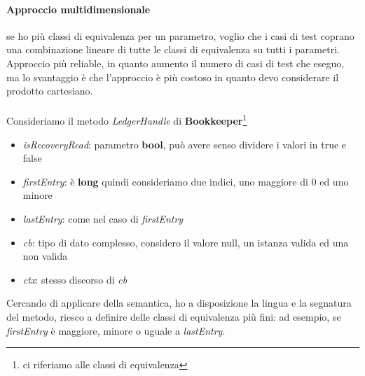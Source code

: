 \documentclass{article}
\begin{document}
\paragraph{Approccio multidimensionale}se ho più classi di equivalenza per un parametro, voglio che i casi di test coprano una combinazione lineare di tutte le classi di equivalenza su tutti i parametri. Approccio più reliable, in quanto aumento il numero di casi di test che eseguo, ma lo svantaggio è che l'approccio è più costoso in quanto devo considerare il prodotto cartesiano.
\\\\ Consideriamo il metodo \textit{LedgerHandle} di \textbf{Bookkeeper}\footnote{ci riferiamo alle classi di equivalenza}
\begin{itemize}
\item \textit{isRecoveryRead}: parametro \textbf{bool}, può avere senso dividere i valori in true e false
\item \textit{firstEntry}: è \textbf{long} quindi consideriamo due indici, uno maggiore di 0 ed uno minore
\item \textit{lastEntry}: come nel caso di \textit{firstEntry}
\item \textit{cb}: tipo di dato complesso, considero il valore null, un istanza valida ed una non valida
\item \textit{ctx}: stesso discorso di \textit{cb}
\end{itemize}
Cercando di applicare della semantica, ho a disposizione la lingua e la segnatura del metodo, riesco a definire delle classi di equivalenza più fini: ad esempio, se \textit{firstEntry} è maggiore, minore o uguale a \textit{lastEntry}.
\end{document}
